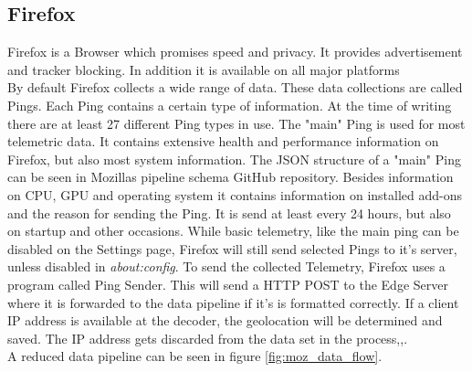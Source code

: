     \subsection{Firefox}
        Firefox is a Browser which promises speed and privacy. It provides advertisement and tracker blocking. In addition it is available on all major platforms\\ 
        By default Firefox collects a wide range of data. These data collections are called Pings. Each Ping contains a certain type of information. At the time of writing there are at least 27 different Ping types in use\cite{mozilla_telemetry_nodate}.
        The "main" Ping is used for most telemetric data. It contains extensive health and performance information on Firefox, but also most system information. The JSON structure of a "main" Ping can be seen in Mozillas pipeline schema GitHub repository\cite{mozilla_mozilla-servicesmozilla-pipeline-schemas_2020}. 
        Besides information on CPU, GPU and operating system it contains information on installed add-ons and the reason for sending the Ping.
        It is send at least every 24 hours, but also on startup and other occasions. While basic telemetry, like the main ping can be disabled on the Settings page, Firefox will still send selected Pings to it's server, unless disabled in \textit{about:config}.
        To send the collected Telemetry, Firefox uses a program called Ping Sender.
        This will send a HTTP POST to the Edge Server where it is forwarded to the data pipeline if it's is formatted correctly.
        If a client IP address is available at the decoder, the geolocation will be determined and saved.
        The IP address gets discarded from the data set in the process\cite{mozilla_overview_2020},\cite{mozilla_http_2020},\cite{firefox_ping_nodate}.\\
        A reduced data pipeline can be seen in figure \ref{fig:moz_data_flow}.
        
